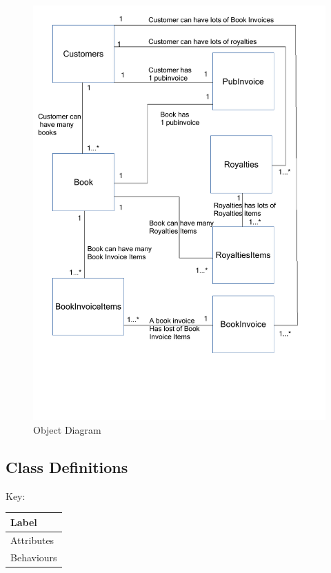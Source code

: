 \begin{figure}[H]
    \caption{Object Diagram} \label{Object_Diagram.pdf}
    \includegraphics[width=\textwidth]{./Design/Object_Diagram.pdf}
\end{figure}

\subsection{Class Definitions}

Key:

\begin{tabular}{|p{2.5cm}|}
    \hline
    \textbf{Label}  \\ \hline
    Attributes \\ \hline
    Behaviours  \\ \hline
    \hline
\end{tabular}

